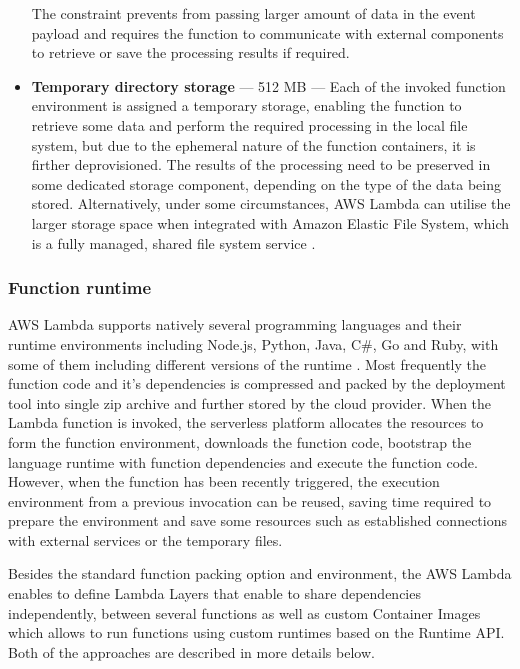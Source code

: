 \begin{itemize}
    The constraint prevents from passing larger amount of data in the event payload and requires the function to communicate with external components to retrieve or save the processing results if required.
    \item \textbf{Temporary directory storage} --- 512 MB --- Each of the invoked function environment is assigned a temporary storage, enabling the function to retrieve some data and perform the required processing in the local file system, but due to the ephemeral nature of the function containers, it is firther deprovisioned. The results of the processing need to be preserved in some dedicated storage component, depending on the type of the data being stored. Alternatively, under some circumstances, AWS Lambda can utilise the larger storage space when integrated with Amazon Elastic File System, which is a fully managed, shared file system service \cite{AWSLambdaEFS}.
\end{itemize}

\subsubsection{Function runtime} \label{chapter:lambda-custom-runtimes}

AWS Lambda supports natively several programming languages and their runtime environments including Node.js, Python, Java, C\#, Go and Ruby, with some of them including different versions of the runtime \cite{AWSLambdaRuntimes}. Most frequently the function code and it's dependencies is compressed and packed by the deployment tool into single zip archive and further stored by the cloud provider. When the Lambda function is invoked, the serverless platform allocates the resources to form the function environment, downloads the function code, bootstrap the language runtime with function dependencies and execute the function code. However, when the function has been recently triggered, the execution environment from a previous invocation can be reused, saving time required to prepare the environment and save some resources such as established connections with external services or the temporary files.

Besides the standard function packing option and environment, the AWS Lambda enables to define Lambda Layers that enable to share dependencies independently, between several functions as well as custom Container Images which allows to run functions using custom runtimes based on the Runtime API. 
Both of the approaches are described in more details below.

